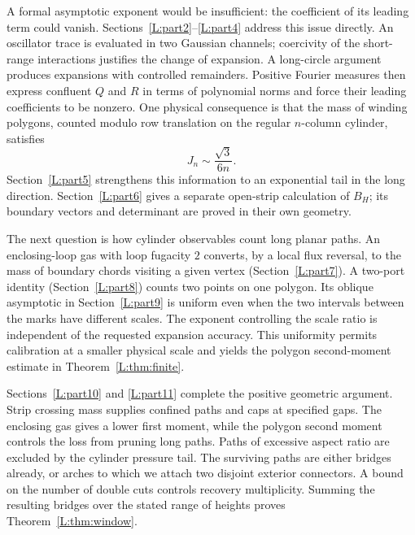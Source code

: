 A formal asymptotic exponent would be insufficient: the coefficient of
its leading term could vanish. Sections~\ref{L:part2}--\ref{L:part4}
address this issue directly. An oscillator trace is evaluated in two
Gaussian channels; coercivity of the short-range interactions justifies
the change of expansion. A long-circle argument produces expansions with
controlled remainders. Positive Fourier measures then express confluent
$Q$ and $R$ in terms of polynomial norms and force their leading
coefficients to be nonzero. One physical consequence is that the mass of
winding polygons, counted modulo row translation on the regular
$n$-column cylinder, satisfies
\[
 J_n\sim\frac{\sqrt3}{6n}.
\]
Section~\ref{L:part5} strengthens this information to an exponential tail
in the long direction. Section~\ref{L:part6} gives a separate open-strip
calculation of $B_H$; its boundary vectors and determinant are proved in
their own geometry.

The next question is how cylinder observables count long planar paths.
An enclosing-loop gas with loop fugacity $2$ converts, by a local flux
reversal, to the mass of boundary chords visiting a given vertex
(Section~\ref{L:part7}). A two-port identity
(Section~\ref{L:part8}) counts two points on one polygon. Its oblique
asymptotic in Section~\ref{L:part9} is uniform even when the two intervals
between the marks have different scales. The exponent controlling the
scale ratio is independent of the requested expansion accuracy. This
uniformity permits calibration at a smaller physical scale and yields
the polygon second-moment estimate in Theorem~\ref{L:thm:finite}.

Sections~\ref{L:part10} and \ref{L:part11} complete the positive geometric
argument. Strip crossing mass supplies confined paths and caps at
specified gaps. The enclosing gas gives a lower first moment, while the
polygon second moment controls the loss from pruning long paths. Paths
of excessive aspect ratio are excluded by the cylinder pressure tail.
The surviving paths are either bridges already, or arches to which we
attach two disjoint exterior connectors. A bound on the number of double
cuts controls recovery multiplicity. Summing the resulting bridges over
the stated range of heights proves Theorem~\ref{L:thm:window}.

